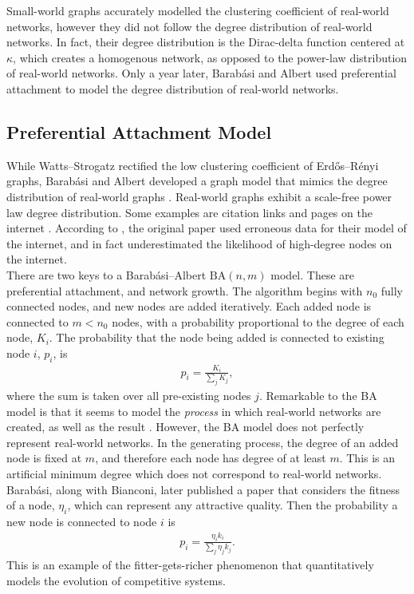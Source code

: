Small-world graphs accurately modelled the clustering coefficient of real-world networks, however they did not follow the degree distribution of real-world networks. In fact, their degree distribution is the Dirac-delta function centered at $\kappa$, which creates a homogenous network, as opposed to the power-law distribution of real-world networks. Only a year later, Barab\'{a}si and Albert used preferential attachment to model the degree distribution of real-world networks.

 
\subsection{Preferential Attachment Model} \label{BA}
While Watts--Strogatz rectified the low clustering coefficient of Erd\H{o}s--R\'enyi graphs, Barab\'{a}si and Albert developed a graph model that mimics the degree distribution of real-world graphs \cite{RN55}. Real-world graphs exhibit a scale-free power law degree distribution. Some examples are citation links and pages on the internet \cite{RN55}. According to \cite{RN56}, the original paper used erroneous data for their model of the internet, and in fact underestimated the likelihood of high-degree nodes on the internet. \\

There are two keys to a Barab\'{a}si--Albert $\mathrm{BA}(n,m)$ model. These are preferential attachment, and network growth. The algorithm begins with $n_0$ fully connected nodes, and new nodes are added iteratively. Each added node is connected to $m<n_0$ nodes, with a probability proportional to the degree of each node, $K_i$. The probability that the node being added is connected to existing node $i$, $p_i$, is
\begin{align*}
    p_i = \frac{K_i}{\sum_j K_j},
\end{align*}
where the sum is taken over all pre-existing nodes $j$. Remarkable to the BA model is that it seems to model the \emph{process} in which real-world networks are created, as well as the result \cite{RN55}. However, the BA model does not perfectly represent real-world networks. In the generating process, the degree of an added node is fixed at $m$, and therefore each node has degree of at least $m$. This is an artificial minimum degree which does not correspond to real-world networks. \\

Barab\'{a}si, along with Bianconi, \cite{RN59} later published a paper that considers the fitness of a node, $\eta_i$, which can represent any attractive quality. Then the probability a new node is connected to node $i$ is 
\begin{align*}
    p_i = \frac{\eta_ik_i}{\sum_j \eta_jk_j}.
\end{align*}
This is an example of the fitter-gets-richer phenomenon that quantitatively models the evolution of competitive systems. 

